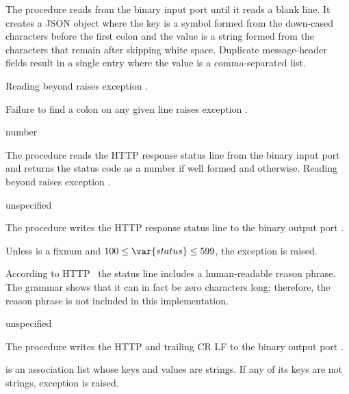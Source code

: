 The  procedure reads from the binary input port
 until it reads a blank line.  It creates a JSON object where
the key is a symbol formed from the down-cased characters before the
first colon and the value is a string formed from the characters that
remain after skipping white space.  Duplicate message-header fields
result in a single entry where the value is a comma-separated list.

Reading beyond  raises exception
.

Failure to find a colon on any given line raises exception
.

\begin{procedure}
\end{procedure}
\returns{} number \alt{} 

The  procedure reads the HTTP response status
line from the binary input port  and returns the status code
as a number if well formed and  otherwise. Reading beyond
 raises exception .

\begin{procedure}
\end{procedure}
\returns{} unspecified

The  procedure writes the HTTP response
status line to the binary output port .

Unless  is a fixnum and $100 \leq \var{status} \leq 599$, the
exception  is
raised.

According to HTTP~\cite{RFC7230} the status line includes a
human-readable reason phrase. The grammar shows that it can in fact be
zero characters long; therefore, the reason phrase is not included in
this implementation.

\begin{procedure}
\end{procedure}
\returns{} unspecified

The  procedure writes the HTTP
 and trailing CR LF to the binary output port
.

 is an association list whose keys and values are
strings. If any of its keys are not strings, exception
 is raised.

